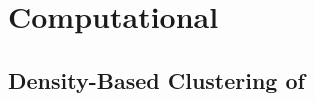 \section{Computational}
\subsection{Density-Based Clustering of \Isols{}}\label{sec:dbscan}
\subsection{\kNNlong{}}